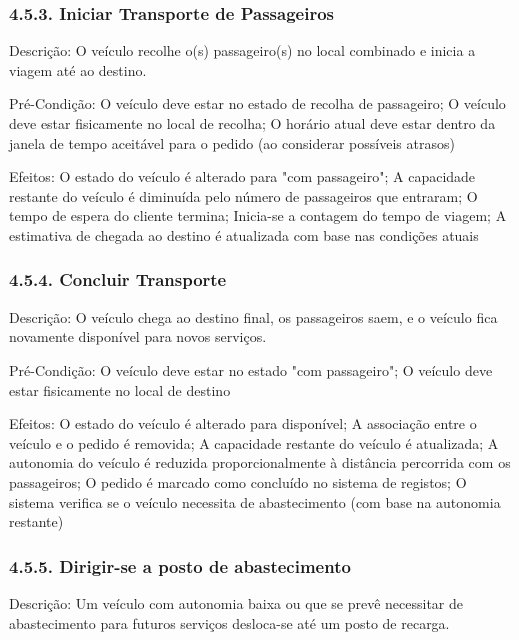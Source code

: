 \documentclass[a4paper]{article}
\begin{document}
\subsubsection*{4.5.3. Iniciar Transporte de Passageiros}
\noindent Descrição: O veículo recolhe o(s) passageiro(s) no local combinado e inicia a viagem até ao destino.

\vspace{0.5cm}

\noindent Pré-Condição: O veículo deve estar no estado de recolha de passageiro; O veículo deve estar fisicamente no local de recolha; O horário atual deve estar dentro da janela de tempo aceitável para o pedido (ao considerar possíveis atrasos)

\vspace{0.5cm}

\noindent Efeitos: O estado do veículo é alterado para "com passageiro"; A capacidade restante do veículo é diminuída pelo número de passageiros que entraram; O tempo de espera do cliente termina; Inicia-se a contagem do tempo de viagem; A estimativa de chegada ao destino é atualizada com base nas condições atuais

\subsubsection*{4.5.4. Concluir Transporte}
\noindent Descrição: O veículo chega ao destino final, os passageiros saem, e o veículo fica novamente disponível para novos serviços.

\vspace{0.5cm}

\noindent Pré-Condição: O veículo deve estar no estado "com passageiro"; O veículo deve estar fisicamente no local de destino

\vspace{0.5cm}

\noindent Efeitos: O estado do veículo é alterado para disponível; A associação entre o veículo e o pedido é removida; A capacidade restante do veículo é atualizada; A autonomia do veículo é reduzida proporcionalmente à distância percorrida com os passageiros; O pedido é marcado como concluído no sistema de registos; O sistema verifica se o veículo necessita de abastecimento (com base na autonomia restante)

\subsubsection*{4.5.5. Dirigir-se a posto de abastecimento}
\noindent Descrição: Um veículo com autonomia baixa ou que se prevê necessitar de abastecimento para futuros serviços desloca-se até um posto de recarga.
\end{document}
